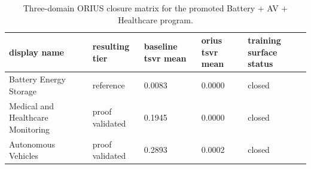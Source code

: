 \begin{table}[htbp]
\centering
\caption{Three-domain ORIUS closure matrix for the promoted Battery + AV + Healthcare program.}
\label{tab:three-domain-closure-matrix}
\begin{tabular}{lllll}
\toprule
\textbf{display name} & \textbf{resulting tier} & \textbf{baseline tsvr mean} & \textbf{orius tsvr mean} & \textbf{training surface status} \\
\midrule
Battery Energy Storage & reference & 0.0083 & 0.0000 & closed \\
Medical and Healthcare Monitoring & proof validated & 0.1945 & 0.0000 & closed \\
Autonomous Vehicles & proof validated & 0.2893 & 0.0002 & closed \\
\bottomrule
\end{tabular}
\end{table}
